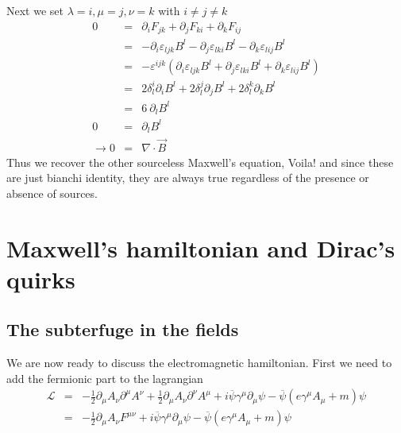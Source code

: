 \documentclass[aps,preprint,preprintnumbers,nofootinbib,showpacs,prd]{revtex4-1}
\newcommand{\nbea}{\begin{eqnarray*}}
\newcommand{\neea}{\end{eqnarray*}}
\begin{document}
Next we set ${\lambda = i, \mu = j, \nu = k}$ with $i \neq j \neq k$
%
\nbea
0 & = & \partial_i F_{jk} + \partial_j F_{k i} + \partial_k F_{i j} \\
& = & - \partial_i \varepsilon_{ljk} B^l- \partial_j \varepsilon_{lki} B^l - \partial_k \varepsilon_{lij} B^l \\
& = & - \varepsilon^{ijk} ( \partial_i \varepsilon_{ljk} B^l + \partial_j \varepsilon_{lki} B^l + \partial_k \varepsilon_{lij} B^l) \\
& = & 2\delta^i_l \partial_i  B^l +2 \delta^j_l \partial_j  B^l + 2\delta^k_l \partial_k  B^l \\
& = & 6~\partial_l B^l \\
0 & = & \partial_l B^l \\
\rightarrow 0 & = & \nabla \cdot \vec B
\neea
Thus we recover the other sourceless Maxwell's equation, Voila! and since these are just bianchi identity, they are always true regardless of the presence or absence of sources.

\section{Maxwell's hamiltonian and Dirac's quirks}

\subsection{The subterfuge in the fields}

We are now ready to discuss the electromagnetic hamiltonian. First we need to add the fermionic part to the lagrangian
%
\nbea
\mathcal{L} & = & -\frac{1}{2} \partial_\mu A_\nu \partial^\mu A^\nu + \frac{1}{2} \partial_\mu A_\nu \partial^\nu A^\mu + i \overline \psi \gamma^\mu \partial_\mu \psi - \overline \psi \left ( e \gamma^\mu A_\mu + m\right ) \psi \\
& = & -\frac{1}{2} \partial_\mu A_\nu F^{\mu\nu} + i \overline \psi \gamma^\mu \partial_\mu \psi - \overline \psi \left ( e \gamma^\mu A_\mu + m\right ) \psi
\neea
%
\end{document}
